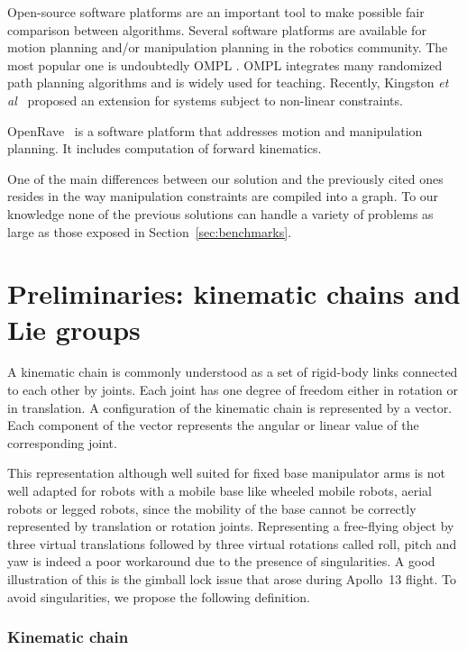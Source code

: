 Open-source software platforms are an important tool to make possible fair
comparison between algorithms.
Several software platforms are available for motion planning and/or manipulation
planning in the robotics community. The most popular one is undoubtedly OMPL \cite{ompl2012}. OMPL integrates many randomized path planning algorithms and is widely used for teaching. Recently, {\color{blue}Kingston \textit{et al}}~\cite{KinMolKav2019} proposed an extension for systems subject to non-linear constraints.

OpenRave~\cite{diankov_thesis} is
a software platform that addresses motion and manipulation planning. It includes
computation of forward kinematics.

One of the main differences between our solution and the previously cited ones resides in the way manipulation constraints are compiled into a graph. To our knowledge none of the previous solutions can handle a variety of problems as large as those exposed in Section~\ref{sec:benchmarks}.

\section{Preliminaries: kinematic chains and Lie groups}\label{partie:preliminary}

A kinematic chain is commonly understood as a set of rigid-body links connected
to each other by joints. Each joint has one degree of freedom either in
rotation or in translation. A configuration of the kinematic chain is represented by a vector. Each component of the vector represents the angular or linear value of the corresponding joint.

This representation although well suited for fixed base manipulator
arms is not well adapted for robots with a mobile base like wheeled
mobile robots, aerial robots or legged robots, since the mobility of the base
cannot be correctly represented by translation or rotation joints.
Representing a free-flying object by three virtual translations followed by
three virtual rotations called roll, pitch and yaw is indeed a poor workaround
due to the presence of singularities. A good illustration of this is the gimball
lock issue that arose during Apollo~13 flight. To avoid singularities, we
propose the following definition.

\subsubsection{Kinematic chain}


